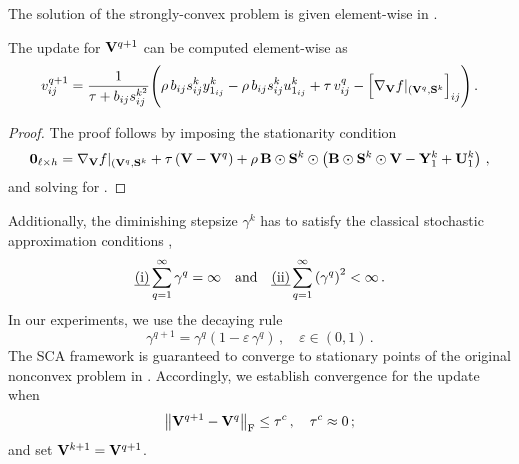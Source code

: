 The solution of the strongly-convex problem is given element-wise in . 
\begin{lemma}\label{lemma:updateV_elementwise_partial}
    The update for $\mathbf{V}^{q+1}$ can be computed element-wise as
    \begin{equation}\label{updateV_elementwise_partial}
        v_{ij}^{q+1}= \frac{1}{\tau + b_{ij} s_{ij}^{k^2}}\Bigg(\rho\, b_{ij} s_{ij}^k y_{1_{ij}}^k - \rho\, b_{ij} s_{ij}^k u_{1_{ij}}^k + \tau\, v_{ij}^q - \Big[\nabla_{\mathbf{V}} f|_{(\mathbf{V}^q, \mathbf{S}^k}\Big]_{ij} \Bigg)\,.
    \end{equation}
\end{lemma}
\begin{proof}
    The proof follows by imposing the stationarity condition
    \begin{equation}
        \mathbf{0}_{\ell\times h} = \nabla_{\mathbf{V}} f|_{(\mathbf{V}^q, \mathbf{S}^k} + \tau \left(\mathbf{V}-\mathbf{V}^q\right) + \rho \, \mathbf{B} \odot \mathbf{S}^k \odot \left( \mathbf{B} \odot \mathbf{S}^k \odot \mathbf{V} - \mathbf{Y}_1^k +\mathbf{U}_1^k\right)\,,
    \end{equation}
    and solving for \V.
\end{proof}

Additionally, the diminishing stepsize $\gamma^k$ has to satisfy the classical stochastic approximation conditions ,
\begin{equation}\label{eq:SCA_stepsize_conditions}
    \text{\emph{(i)}} \sum_{q=1}^\infty \gamma^q = \infty \quad  \text{and} \quad\text{\emph{(ii)}} \sum_{q=1}^\infty \left( \gamma^q \right)^2 < \infty\,.
\end{equation}
In our experiments, we use the decaying rule 
\begin{equation}\label{eq:SCA_stepsize_rule}
    \gamma^{q+1}=\gamma^q\left(1-\varepsilon \,\gamma^q\right)\,, \quad \varepsilon \in (0,1)\,.
\end{equation}
The SCA framework is guaranteed to converge to stationary points of the original nonconvex problem in  .
Accordingly, we establish convergence for the update when
\begin{equation}\label{eq:convergenceV_approx}
    \norm{\mathbf{V}^{q+1}-\mathbf{V}^q}_{\mathrm{F}}\leq \tau^c\,, \quad \tau^c \approx 0\,;
\end{equation}
and set $\mathbf{V}^{k+1}=\mathbf{V}^{q+1}$.

